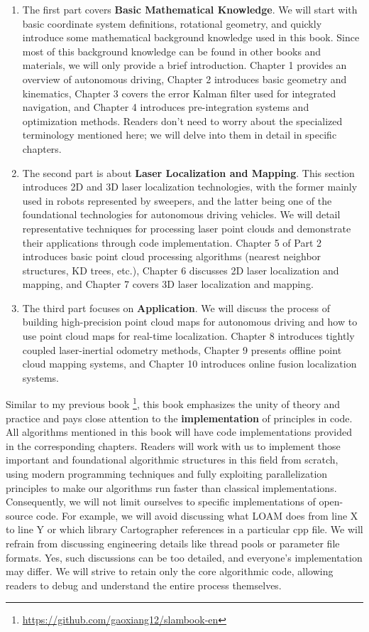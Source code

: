 \begin{enumerate}
	\item The first part covers \textbf{Basic Mathematical Knowledge}. We will start with basic coordinate system definitions, rotational geometry, and quickly introduce some mathematical background knowledge used in this book. Since most of this background knowledge can be found in other books and materials, we will only provide a brief introduction. Chapter 1 provides an overview of autonomous driving, Chapter 2 introduces basic geometry and kinematics, Chapter 3 covers the error Kalman filter used for integrated navigation, and Chapter 4 introduces pre-integration systems and optimization methods. Readers don't need to worry about the specialized terminology mentioned here; we will delve into them in detail in specific chapters.
	\item The second part is about \textbf{Laser Localization and Mapping}. This section introduces 2D and 3D laser localization technologies, with the former mainly used in robots represented by sweepers, and the latter being one of the foundational technologies for autonomous driving vehicles. We will detail representative techniques for processing laser point clouds and demonstrate their applications through code implementation. Chapter 5 of Part 2 introduces basic point cloud processing algorithms (nearest neighbor structures, KD trees, etc.), Chapter 6 discusses 2D laser localization and mapping, and Chapter 7 covers 3D laser localization and mapping.
	\item The third part focuses on \textbf{Application}. We will discuss the process of building high-precision point cloud maps for autonomous driving and how to use point cloud maps for real-time localization. Chapter 8 introduces tightly coupled laser-inertial odometry methods, Chapter 9 presents offline point cloud mapping systems, and Chapter 10 introduces online fusion localization systems.
\end{enumerate}

Similar to my previous book \cite{Gao2017} \footnote{\url{https://github.com/gaoxiang12/slambook-en}}, this book emphasizes the unity of theory and practice and pays close attention to the \textbf{implementation} of principles in code. All algorithms mentioned in this book will have code implementations provided in the corresponding chapters. Readers will work with us to implement those important and foundational algorithmic structures in this field from scratch, using modern programming techniques and fully exploiting parallelization principles to make our algorithms run faster than classical implementations. Consequently, we will not limit ourselves to specific implementations of open-source code. For example, we will avoid discussing what LOAM \cite{Zhang2014} does from line X to line Y or which library Cartographer \cite{Hess2016} references in a particular cpp file. We will refrain from discussing engineering details like thread pools or parameter file formats. Yes, such discussions can be too detailed, and everyone's implementation may differ. We will strive to retain only the core algorithmic code, allowing readers to debug and understand the entire process themselves.

